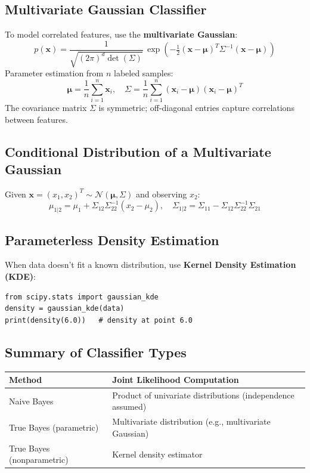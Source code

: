 \documentclass[11pt]{article}
\begin{document}
\subsection{Multivariate Gaussian Classifier}
To model correlated features, use the \textbf{multivariate Gaussian}:
\[
  p(\mathbf{x}) = \frac{1}{\sqrt{(2\pi)^d \det(\Sigma)}}\,\exp\!\left(-\tfrac{1}{2}(\mathbf{x}-\boldsymbol{\mu})^T \Sigma^{-1} (\mathbf{x}-\boldsymbol{\mu})\right)
\]
Parameter estimation from $n$ labeled samples:
\[
  \boldsymbol{\mu} = \frac{1}{n}\sum_{i=1}^n \mathbf{x}_i, \quad
  \Sigma = \frac{1}{n}\sum_{i=1}^n (\mathbf{x}_i - \boldsymbol{\mu})(\mathbf{x}_i - \boldsymbol{\mu})^T
\]
The covariance matrix $\Sigma$ is symmetric; off-diagonal entries capture correlations between features.

\subsection{Conditional Distribution of a Multivariate Gaussian}
Given $\mathbf{x} = (x_1, x_2)^T \sim \mathcal{N}(\boldsymbol{\mu}, \Sigma)$ and observing $x_2$:
\[
  \mu_{1|2} = \mu_1 + \Sigma_{12}\Sigma_{22}^{-1}(x_2 - \mu_2), \quad
  \Sigma_{1|2} = \Sigma_{11} - \Sigma_{12}\Sigma_{22}^{-1}\Sigma_{21}
\]

\subsection{Parameterless Density Estimation}
When data doesn't fit a known distribution, use \textbf{Kernel Density Estimation (KDE)}:
\begin{lstlisting}
from scipy.stats import gaussian_kde
density = gaussian_kde(data)
print(density(6.0))   # density at point 6.0
\end{lstlisting}

\subsection{Summary of Classifier Types}
\begin{center}
\begin{tabular}{ll}
  \toprule
  Method & Joint Likelihood Computation \\
  \midrule
  Naive Bayes & Product of univariate distributions (independence assumed) \\
  True Bayes (parametric) & Multivariate distribution (e.g., multivariate Gaussian) \\
  True Bayes (nonparametric) & Kernel density estimator \\
  \bottomrule
\end{tabular}
\end{center}
\end{document}
